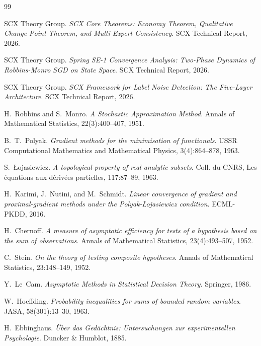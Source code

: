 \documentclass[11pt,a4paper]{article}
\theoremstyle{remark}
\begin{document}
\begin{thebibliography}{99}

SCX Theory Group.
\emph{SCX Core Theorems: Economy Theorem, Qualitative Change Point Theorem, and Multi-Expert Consistency}.
SCX Technical Report, 2026.

SCX Theory Group.
\emph{Spring SE-1 Convergence Analysis: Two-Phase Dynamics of Robbins-Monro SGD on State Space}.
SCX Technical Report, 2026.

SCX Theory Group.
\emph{SCX Framework for Label Noise Detection: The Five-Layer Architecture}.
SCX Technical Report, 2026.

H.~Robbins and S.~Monro.
\emph{A Stochastic Approximation Method}.
Annals of Mathematical Statistics, 22(3):400--407, 1951.

B.~T.~Polyak.
\emph{Gradient methods for the minimisation of functionals}.
USSR Computational Mathematics and Mathematical Physics, 3(4):864--878, 1963.

S.~Łojasiewicz.
\emph{A topological property of real analytic subsets}.
Coll. du CNRS, Les équations aux dérivées partielles, 117:87--89, 1963.

H.~Karimi, J.~Nutini, and M.~Schmidt.
\emph{Linear convergence of gradient and proximal-gradient methods under the Polyak-Łojasiewicz condition}.
ECML-PKDD, 2016.

H.~Chernoff.
\emph{A measure of asymptotic efficiency for tests of a hypothesis based on the sum of observations}.
Annals of Mathematical Statistics, 23(4):493--507, 1952.

C.~Stein.
\emph{On the theory of testing composite hypotheses}.
Annals of Mathematical Statistics, 23:148--149, 1952.

Y.~Le~Cam.
\emph{Asymptotic Methods in Statistical Decision Theory}.
Springer, 1986.

W.~Hoeffding.
\emph{Probability inequalities for sums of bounded random variables}.
JASA, 58(301):13--30, 1963.

H.~Ebbinghaus.
\emph{Über das Gedächtnis: Untersuchungen zur experimentellen Psychologie}.
Duncker \& Humblot, 1885.


\end{thebibliography}
\end{document}
